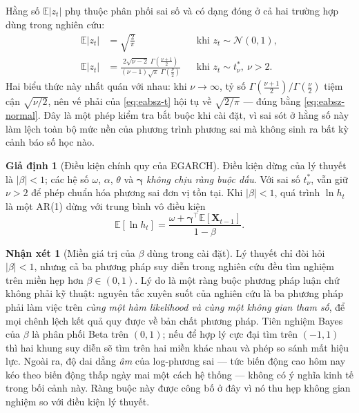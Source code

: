 \documentclass[12pt,a4paper]{article}
\numberwithin{equation}{section}
\theoremstyle{definition}
\newtheorem{assumption}{Giả định}[section]
\newtheorem{remark}{Nhận xét}[section]
\newcommand{\E}{\mathbb{E}}
\newcommand{\Xvec}{\symbf{X}}
\newcommand{\bmgamma}{\symbf{\gamma}}
\begin{document}
	Hằng số $\E\lvert z_t\rvert$ phụ thuộc phân phối sai số và có dạng đóng ở cả hai trường
	hợp dùng trong nghiên cứu:
	\begin{align}
		\E\lvert z_t\rvert &= \sqrt{\tfrac{2}{\pi}}
		&&\text{khi } z_t\sim\mathcal{N}(0,1),
		\label{eq:eabsz-normal}\\[0.2em]
		\E\lvert z_t\rvert &= \frac{2\sqrt{\nu-2}\;\Gamma\!\left(\frac{\nu+1}{2}\right)}
		{(\nu-1)\sqrt{\pi}\;\Gamma\!\left(\frac{\nu}{2}\right)}
		&&\text{khi } z_t\sim t^{*}_{\nu},\ \nu>2.
		\label{eq:eabsz-t}
	\end{align}
	Hai biểu thức này nhất quán với nhau: khi $\nu\to\infty$, tỷ số
	$\Gamma(\frac{\nu+1}{2})/\Gamma(\frac{\nu}{2})$ tiệm cận $\sqrt{\nu/2}$, nên vế phải của
	\eqref{eq:eabsz-t} hội tụ về $\sqrt{2/\pi}$ --- đúng bằng \eqref{eq:eabsz-normal}. Đây là
	một phép kiểm tra bắt buộc khi cài đặt, vì sai sót ở hằng số này làm lệch toàn bộ mức nền
	của phương trình phương sai mà không sinh ra bất kỳ cảnh báo số học nào.

	\begin{assumption}[Điều kiện chính quy của EGARCH]\label{as:egarch}
		Điều kiện dừng của lý thuyết là $\lvert\beta\rvert<1$; các hệ số $\omega$, $\alpha$,
		$\theta$ và $\bmgamma$ \emph{không chịu ràng buộc dấu}. Với sai số $t^{*}_{\nu}$, vẫn
		giữ $\nu>2$ để phép chuẩn hóa phương sai đơn vị tồn tại. Khi $\lvert\beta\rvert<1$,
		quá trình $\ln h_t$ là một AR(1) dừng với trung bình vô điều kiện
		\begin{equation}
			\E\!\left[\ln h_t\right]=\frac{\omega+\bmgamma^{\top}\E\!\left[\Xvec_{t-1}\right]}{1-\beta}.
			\label{eq:egarch-unconditional-logvar}
		\end{equation}
	\end{assumption}

	\begin{remark}[Miền giá trị của $\beta$ dùng trong cài đặt]\label{rem:beta-domain}
		Lý thuyết chỉ đòi hỏi $\lvert\beta\rvert<1$, nhưng cả ba phương pháp suy diễn trong
		nghiên cứu đều tìm nghiệm trên miền hẹp hơn $\beta\in(0,1)$. Lý do là một ràng buộc
		phương pháp luận chứ không phải kỹ thuật: nguyên tắc xuyên suốt của nghiên cứu là ba
		phương pháp phải làm việc trên \emph{cùng một hàm likelihood và cùng một không gian
		tham số}, để mọi chênh lệch kết quả quy được về bản chất phương pháp. Tiên nghiệm Bayes
		của $\beta$ là phân phối Beta trên $(0,1)$; nếu để hợp lý cực đại tìm trên $(-1,1)$ thì
		hai khung suy diễn sẽ tìm trên hai miền khác nhau và phép so sánh mất hiệu lực. Ngoài
		ra, độ dai dẳng \emph{âm} của log-phương sai --- tức biến động cao hôm nay kéo theo
		biến động thấp ngày mai một cách hệ thống --- không có ý nghĩa kinh tế trong bối cảnh
		này. Ràng buộc này được công bố ở đây vì nó thu hẹp không gian nghiệm so với điều kiện
		lý thuyết.
	\end{remark}
\end{document}
